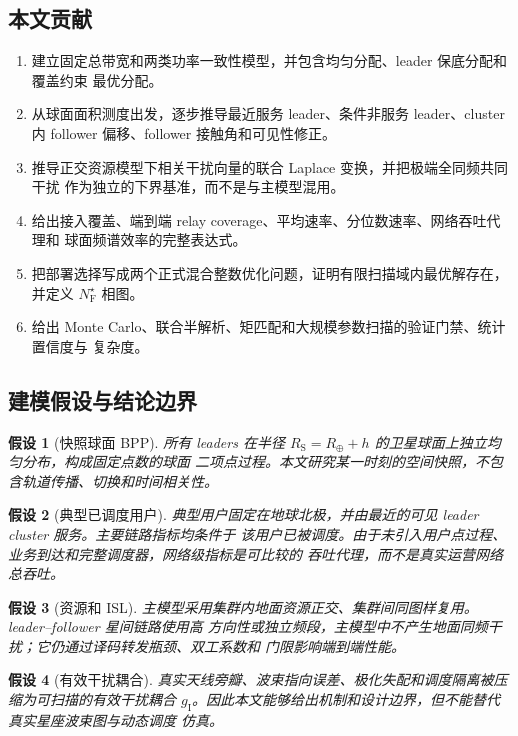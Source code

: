 \documentclass[UTF8,a4paper,11pt]{ctexart}
\newtheorem{assumption}{假设}[section]
\newcommand{\Rearth}{R_{\oplus}}
\newcommand{\Rsat}{R_{\mathrm S}}
\begin{document}
\subsection{本文贡献}

\begin{enumerate}[leftmargin=2em]
  \item 建立固定总带宽和两类功率一致性模型，并包含均匀分配、leader 保底分配和覆盖约束
  最优分配。
  \item 从球面面积测度出发，逐步推导最近服务 leader、条件非服务 leader、cluster 内
  follower 偏移、follower 接触角和可见性修正。
  \item 推导正交资源模型下相关干扰向量的联合 Laplace 变换，并把极端全同频共同干扰
  作为独立的下界基准，而不是与主模型混用。
  \item 给出接入覆盖、端到端 relay coverage、平均速率、分位数速率、网络吞吐代理和
  球面频谱效率的完整表达式。
  \item 把部署选择写成两个正式混合整数优化问题，证明有限扫描域内最优解存在，并定义
  $N_{\mathrm F}^{\star}$ 相图。
  \item 给出 Monte Carlo、联合半解析、矩匹配和大规模参数扫描的验证门禁、统计置信度与
  复杂度。
\end{enumerate}

\subsection{建模假设与结论边界}

\begin{assumption}[快照球面 BPP]
所有 leaders 在半径 $\Rsat=\Rearth+h$ 的卫星球面上独立均匀分布，构成固定点数的球面
二项点过程。本文研究某一时刻的空间快照，不包含轨道传播、切换和时间相关性。
\end{assumption}

\begin{assumption}[典型已调度用户]
典型用户固定在地球北极，并由最近的可见 leader cluster 服务。主要链路指标均条件于
该用户已被调度。由于未引入用户点过程、业务到达和完整调度器，网络级指标是可比较的
吞吐代理，而不是真实运营网络总吞吐。
\end{assumption}

\begin{assumption}[资源和 ISL]
主模型采用集群内地面资源正交、集群间同图样复用。leader--follower 星间链路使用高
方向性或独立频段，主模型中不产生地面同频干扰；它仍通过译码转发瓶颈、双工系数和
门限影响端到端性能。
\end{assumption}

\begin{assumption}[有效干扰耦合]
真实天线旁瓣、波束指向误差、极化失配和调度隔离被压缩为可扫描的有效干扰耦合
$g_{\mathrm I}$。因此本文能够给出机制和设计边界，但不能替代真实星座波束图与动态调度
仿真。
\end{assumption}
\end{document}
